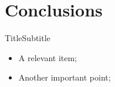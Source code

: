 \section{Conclusions}

    \begin{frame}{Title}{Subtitle}\vspace*{-2em}
        \begin{itemize}
            \item<2->  A \alert{relevant} item;
            \item<3->  Another \alert{important} point;
        \end{itemize}
    \end{frame}





